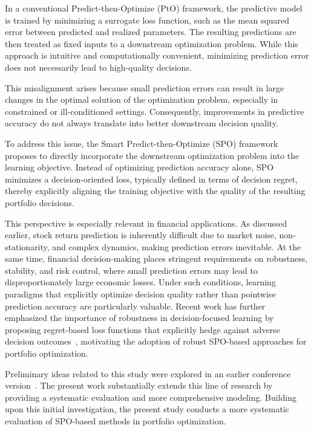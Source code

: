 \documentclass[review]{elsarticle}
\begin{document}
In a conventional Predict-then-Optimize (PtO) framework, the predictive model is trained by minimizing a surrogate loss function, such as the mean squared error between predicted and realized parameters. The resulting predictions are then treated as fixed inputs to a downstream optimization problem. While this approach is intuitive and computationally convenient, minimizing prediction error does not necessarily lead to high-quality decisions.

This misalignment arises because small prediction errors can result in large changes in the optimal solution of the optimization problem, especially in constrained or ill-conditioned settings. Consequently, improvements in predictive accuracy do not always translate into better downstream decision quality.

To address this issue, the Smart Predict-then-Optimize (SPO) framework proposes to directly incorporate the downstream optimization problem into the learning objective. Instead of optimizing prediction accuracy alone, SPO minimizes a decision-oriented loss, typically defined in terms of decision regret, thereby explicitly aligning the training objective with the quality of the resulting portfolio decisions.

This perspective is especially relevant in financial applications. As discussed earlier, stock return prediction is inherently difficult due to market noise, non-stationarity, and complex dynamics, making prediction errors inevitable. At the same time, financial decision-making places stringent requirements on robustness, stability, and risk control, where small prediction errors may lead to disproportionately large economic losses. Under such conditions, learning paradigms that explicitly optimize decision quality rather than pointwise prediction accuracy are particularly valuable. Recent work has further emphasized the importance of robustness in decision-focused learning by proposing regret-based loss functions that explicitly hedge against adverse decision outcomes~\cite{schutte2024robust}, motivating the adoption of robust SPO-based approaches for portfolio optimization.

Preliminary ideas related to this study were explored in an earlier conference version~\cite{Wang2025EndToEndSPO}. The present work substantially extends this line of research by providing a systematic evaluation and more comprehensive modeling. Building upon this initial investigation, the present study conducts a more systematic evaluation of SPO-based methods in portfolio optimization.
\end{document}
